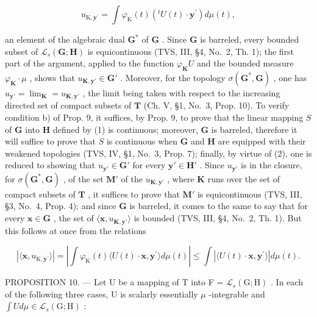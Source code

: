 \[
u _ {\mathrm{K}, \mathbf {y} ^ {\prime}} = \int \varphi_ {\mathrm{K}} (t) \left(^ {t} U (t) \cdot \mathbf {y} ^ {\prime}\right) d \mu (t),
\]

an element of the algebraic dual \(\mathbf{G}^*\) of \(\mathbf{G}\) . Since \(\mathbf{G}\) is barreled, every bounded subset of \(\mathcal{L}_s(\mathbf{G};\mathbf{H})\) is equicontinuous (TVS, III, §4, No.~2, Th. 1); the first part of the argument, applied to the function \(\varphi_{\mathbf{K}}U\) and the bounded measure \(\varphi_{\mathbf{K}}\cdot \mu\) , shows that \(u_{\mathbf{K},\mathbf{y}'}\in \mathbf{G}'\) . Moreover, for the topology \(\sigma (\mathbf{G}^{*},\mathbf{G})\) , one has \(u_{\mathbf{y}'} = \lim_{\mathbf{K}} = u_{\mathbf{K},\mathbf{y}'}\) , the limit being taken with respect to the increasing directed set of compact subsets of \(\mathbf{T}\) (Ch. V, §1, No.~3, Prop. 10). To verify condition b) of Prop. 9, it suffices, by Prop. 9, to prove that the linear mapping \(S\) of \(\mathbf{G}\) into \(\mathbf{H}\) defined by (1) is continuous; moreover, \(\mathbf{G}\) is barreled, therefore it will suffice to prove that \(S\) is continuous when \(\mathbf{G}\) and \(\mathbf{H}\) are equipped with their weakened topologies (TVS, IV, §1, No.~3, Prop. 7); finally, by virtue of (2), one is reduced to showing that \(u_{\mathbf{y}'}\in \mathbf{G}'\) for every \(\mathbf{y}'\in \mathbf{H}'\) . Since \(u_{\mathbf{y}'}\) is in the closure, for \(\sigma (\mathbf{G}^{*},\mathbf{G})\) , of the set \(\mathbf{M}'\) of the \(u_{\mathbf{K},\mathbf{y}'}\) , where \(\mathbf{K}\) runs over the set of compact subsets of \(\mathbf{T}\) , it suffices to prove that \(\mathbf{M}'\) is equicontinuous (TVS, III, §3, No.~4, Prop. 4); and since \(\mathbf{G}\) is barreled, it comes to the same to say that for every \(\mathbf{x}\in \mathbf{G}\) , the set of \(\langle \mathbf{x},u_{\mathbf{K},\mathbf{y}'}\rangle\) is bounded (TVS, III, §4, No.~2, Th. 1). But this follows at once from the relations

\[
| \langle \mathbf {x}, u _ {\mathrm{K}, \mathbf {y} ^ {\prime}} \rangle | = \left| \int \varphi_ {\mathrm{K}} (t) \langle U (t) \cdot \mathbf {x}, \mathbf {y} ^ {\prime} \rangle d \mu (t) \right| \leqslant \int | \langle U (t) \cdot \mathbf {x}, \mathbf {y} ^ {\prime} \rangle | d \mu (t).
\]

PROPOSITION 10. --- Let U be a mapping of T into F = \(\mathcal{L}_s(\mathrm{G};\mathrm{H})\) . In each of the following three cases, U is scalarly essentially \(\mu\) -integrable and \(\int U d\mu \in \mathcal{L}_s(\mathrm{G};\mathrm{H})\) :

